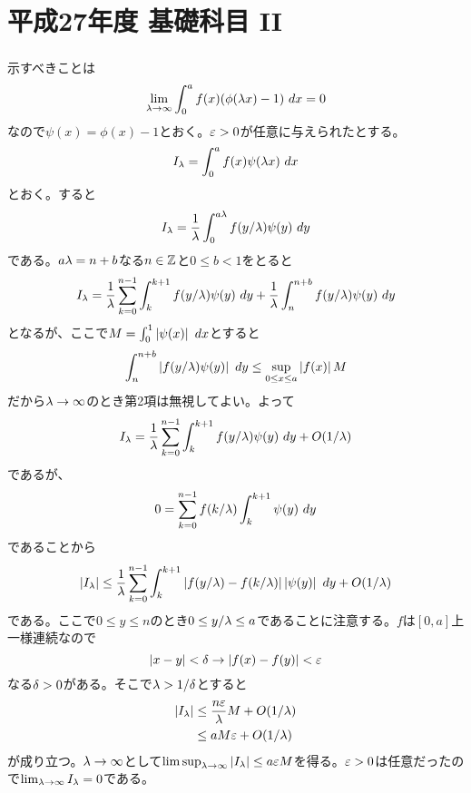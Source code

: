 \section{平成27年度 基礎科目 II}

\subsubsection{}
\barquo{
$f(x), \phi(x)$は区間$[0,\infty)$上の実数値連続関数とし、さらに$\phi(x)$は
\begin{gather*}
  \phi(x) = \phi(x+1) \quad (x \geq 0) \\
  \int_0^1 \phi(x) \ dx = 1
\end{gather*}
をみたすとする。このとき、任意の実数$a > 0$に対し
\[
\lim_{\grl \to \infty} \int_0^a f(x)\phi(\grl x) \ dx = \int_0^a f(x) \ dx
\]
が成り立つことを示せ。
}
\begin{sol}
  示すべきことは
  \[
  \lim_{{\lambda} \to \infty} \int_0^a f(x)(\phi({\lambda} x) - 1) \ dx = 0
  \]
  なので$\psi(x) = \phi(x) -1$とおく。${\varepsilon} > 0$が任意に与えられたとする。
  \[
  I_{\grl} = \int_0^a f(x)\psi(\grl x) \ dx
  \]
  とおく。すると
  \[
  I_{{\lambda}} = \frac{1}{{\lambda}}  \int_0^{a{\lambda}} f( y/ {\lambda}) \psi(y) \ dy
  \]
  である。$a{\lambda} = n + b$なる$n \in {\mathbb Z}$と$0 \leq b < 1$をとると
  \[
  I_{{\lambda}} = \frac{1}{{\lambda}}  \sum_{k=0}^{n-1}  \int_k^{k+1} f( y/ {\lambda}) \psi(y) \ dy + \frac{1}{{\lambda}}  \int_n^{n+b} f( y/ {\lambda}) \psi(y) \ dy
  \]
  となるが、ここで$M = \int_0^1 \abs{\psi(x)} \ dx$とすると
  \[
  \int_n^{n+b}  \left \lvert f( y/ {\lambda}) \psi(y)  \right \rvert  \ dy \leq \sup_{0 \leq x \leq a} \left \lvert f(x) \right \rvert M
  \]
  だから${\lambda} \to \infty$のとき第2項は無視してよい。よって
  \[
    I_{{\lambda}} = \frac{1}{{\lambda}}  \sum_{k=0}^{n-1}  \int_k^{k+1} f( y/ {\lambda}) \psi(y) \ dy + O(1/{\lambda})
  \]
  であるが、
  \[
  0 = \sum_{k=0}^{n-1} f(k/{\lambda}) \int_k^{k+1} \psi(y) \ dy
  \]
  であることから
  \[
  \left \lvert  I_{{\lambda}}  \right \rvert \leq  \frac{1}{{\lambda}}  \sum_{k=0}^{n-1}  \int_k^{k+1} \left \lvert f( y/ {\lambda})  - f(k/{\lambda})  \right \rvert \left \lvert \psi(y) \right \rvert \ dy + O(1/{\lambda})
  \]
  である。ここで$0 \leq y \leq n$のとき$0 \leq y/{\lambda} \leq a$であることに注意する。$f$は$[0,a]$上一様連続なので
  \[
  \left \lvert x-y \right \rvert < {\delta} \to \left \lvert f(x) - f(y) \right \rvert < {\varepsilon}
  \]
  なる${\delta} > 0$がある。そこで${\lambda} > 1/{\delta}$とすると
  \begin{align*}
    \left \lvert I_{{\lambda}} \right \rvert &\leq \frac{n {\varepsilon} }{{\lambda}} M + O(1/{\lambda}) \\
    &\leq aM{\varepsilon} + O(1/{\lambda})
  \end{align*}
  が成り立つ。${\lambda} \to \infty$として$\limsup_{{\lambda} \to \infty} \left \lvert I_{{\lambda}} \right \rvert \leq a {\varepsilon} M$を得る。${\varepsilon} > 0$は任意だったので$\lim_{{\lambda} \to \infty } I_{{\lambda}} = 0$である。
\end{sol}

